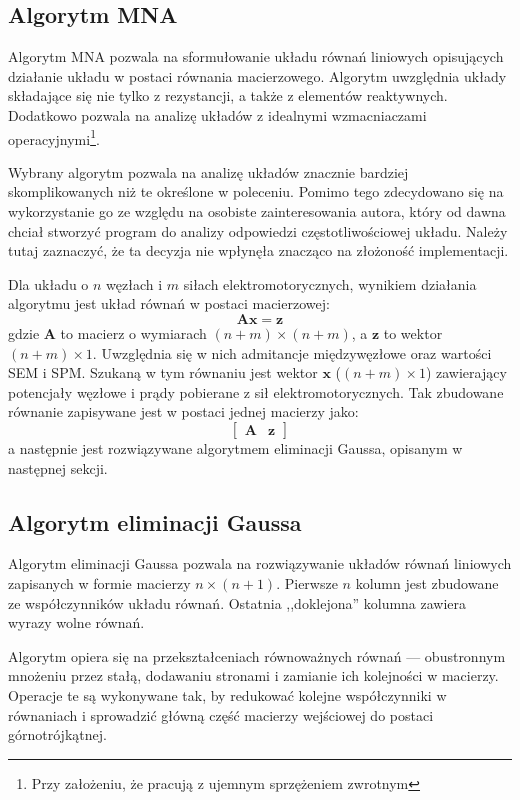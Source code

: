 \documentclass[11pt, final]{article}
\begin{document}
\subsection{Algorytm MNA}
Algorytm MNA pozwala na sformułowanie układu równań liniowych opisujących działanie układu w postaci równania macierzowego.
Algorytm uwzględnia układy składające się nie tylko z rezystancji, a także z elementów reaktywnych. Dodatkowo pozwala na analizę układów z idealnymi wzmacniaczami operacyjnymi\footnote{Przy założeniu, że pracują z ujemnym sprzężeniem zwrotnym}.

Wybrany algorytm pozwala na analizę układów znacznie bardziej skomplikowanych niż te określone w poleceniu. Pomimo tego zdecydowano się na wykorzystanie go ze względu na osobiste zainteresowania autora, który od dawna chciał stworzyć program do analizy odpowiedzi częstotliwościowej układu. Należy tutaj zaznaczyć, że ta decyzja nie wpłynęła znacząco na złożoność implementacji.

Dla układu o $n$ węzłach i $m$ siłach elektromotorycznych, wynikiem działania algorytmu jest układ równań w postaci macierzowej:
$$ \mathbf{Ax} = \mathbf{z}$$
gdzie $\mathbf{A}$ to macierz o wymiarach $(n+m)\times(n+m)$, a $\mathbf{z}$ to wektor $(n+m)\times 1$. Uwzględnia się w nich admitancje międzywęzłowe oraz wartości SEM i SPM. Szukaną w tym równaniu jest wektor $\mathbf{x}$ ($(n+m)\times 1$) zawierający potencjały węzłowe i prądy pobierane z sił elektromotorycznych.
Tak zbudowane równanie zapisywane jest w postaci jednej macierzy jako:
$$ \begin{bmatrix} \mathbf{A} & \mathbf{z} \end{bmatrix} $$
a następnie jest rozwiązywane algorytmem eliminacji Gaussa, opisanym w następnej sekcji.

\subsection{Algorytm eliminacji Gaussa}
Algorytm eliminacji Gaussa pozwala na rozwiązywanie układów równań liniowych zapisanych w formie macierzy $n\times (n+1)$. Pierwsze $n$ kolumn jest zbudowane ze współczynników układu równań. Ostatnia ,,doklejona'' kolumna zawiera wyrazy wolne równań.

Algorytm opiera się na przekształceniach równoważnych równań --- obustronnym mnożeniu przez stałą, dodawaniu stronami i zamianie ich kolejności w macierzy. Operacje te są wykonywane tak, by redukować kolejne współczynniki w równaniach i sprowadzić główną część macierzy wejściowej do postaci górnotrójkątnej.
\end{document}
